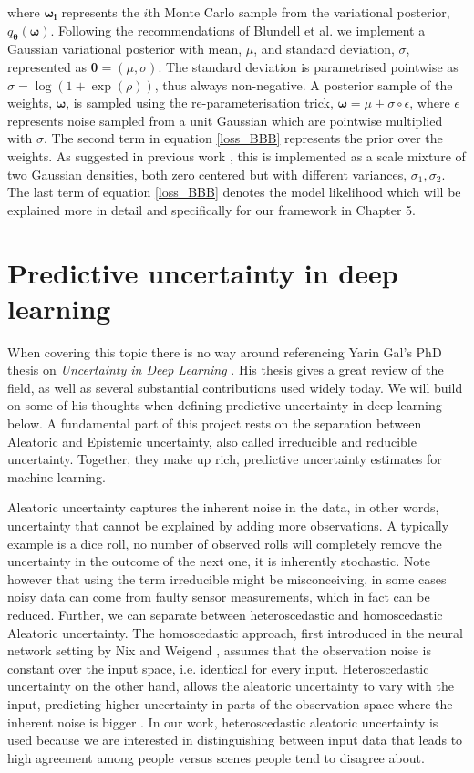 \documentclass[a4paper,12pt]{report}
\begin{document}
where $\bm{\omega_i}$ represents the $i$th Monte Carlo sample from the variational posterior, $q_{\bm{\theta}}(\bm{\omega})$. Following the recommendations of Blundell et al. \cite{blundell2015weight} we implement a Gaussian variational posterior with mean, $\mu$, and standard deviation, $\sigma$, represented as $\bm{\theta} = (\mu, \sigma)$. The standard deviation is parametrised pointwise as $\sigma = \log(1+\exp{(\rho)})$, thus always non-negative. A posterior sample of the weights, $\bm{\omega}$, is sampled using the re-parameterisation trick, $\bm{\omega} = \mu + \sigma \circ \epsilon$, where $\epsilon$ represents noise sampled from a unit Gaussian which are pointwise multiplied with $\sigma$. The second term in equation \eqref{loss_BBB} represents the prior over the weights. As suggested in previous work \cite{blundell2015weight}, this is implemented as a scale mixture of two Gaussian densities, both zero centered but with different variances, $\sigma_1, \sigma_2$. The last term of equation \eqref{loss_BBB} denotes the model likelihood which will be explained more in detail and specifically for our framework in Chapter 5.

\section{Predictive uncertainty in deep learning}
When covering this topic there is no way around referencing Yarin Gal's PhD thesis on \textit{Uncertainty in Deep Learning} \cite{gal2016uncertainty}. His thesis gives a great review of the field, as well as several substantial contributions used widely today. We will build on some of his thoughts when defining predictive uncertainty in deep learning below. A fundamental part of this project rests on the separation between Aleatoric and Epistemic uncertainty, also called irreducible and reducible uncertainty. Together, they make up rich, predictive uncertainty estimates for machine learning. 

Aleatoric uncertainty captures the inherent noise in the data, in other words, uncertainty that cannot be explained by adding more observations. A typically example is a dice roll, no number of observed rolls will completely remove the uncertainty in the outcome of the next one, it is inherently stochastic. Note however that using the term irreducible might be misconceiving, in some cases noisy data can come from faulty  sensor measurements, which in fact can be reduced. Further, we can separate between heteroscedastic and homoscedastic Aleatoric uncertainty. The homoscedastic approach, first introduced in the neural network setting by Nix and Weigend \cite{nix1994estimating}, assumes that the observation noise is constant over the input space, i.e. identical for every input. Heteroscedastic uncertainty on the other hand, allows the aleatoric uncertainty to vary with the input, predicting higher uncertainty in parts of the observation space where the inherent noise is bigger \cite{le2005heteroscedastic}. In our work, heteroscedastic aleatoric uncertainty is used because we are interested in distinguishing between  input data that leads to high agreement among people versus scenes people tend to disagree about. 
\end{document}
